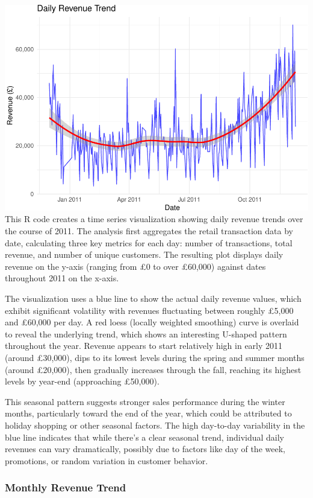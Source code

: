 \documentclass[
]{article}
\begin{document}
\includegraphics{capstone_customer_segmentation_files/figure-latex/exploratory-data-analysis4-1.pdf}
This R code creates a time series visualization showing daily revenue
trends over the course of 2011. The analysis first aggregates the retail
transaction data by date, calculating three key metrics for each day:
number of transactions, total revenue, and number of unique customers.
The resulting plot displays daily revenue on the y-axis (ranging from £0
to over £60,000) against dates throughout 2011 on the x-axis.

The visualization uses a blue line to show the actual daily revenue
values, which exhibit significant volatility with revenues fluctuating
between roughly £5,000 and £60,000 per day. A red loess (locally
weighted smoothing) curve is overlaid to reveal the underlying trend,
which shows an interesting U-shaped pattern throughout the year. Revenue
appears to start relatively high in early 2011 (around £30,000), dips to
its lowest levels during the spring and summer months (around £20,000),
then gradually increases through the fall, reaching its highest levels
by year-end (approaching £50,000).

This seasonal pattern suggests stronger sales performance during the
winter months, particularly toward the end of the year, which could be
attributed to holiday shopping or other seasonal factors. The high
day-to-day variability in the blue line indicates that while there's a
clear seasonal trend, individual daily revenues can vary dramatically,
possibly due to factors like day of the week, promotions, or random
variation in customer behavior.\newpage

\subsubsection{Monthly Revenue Trend}\label{monthly-revenue-trend}
\end{document}
